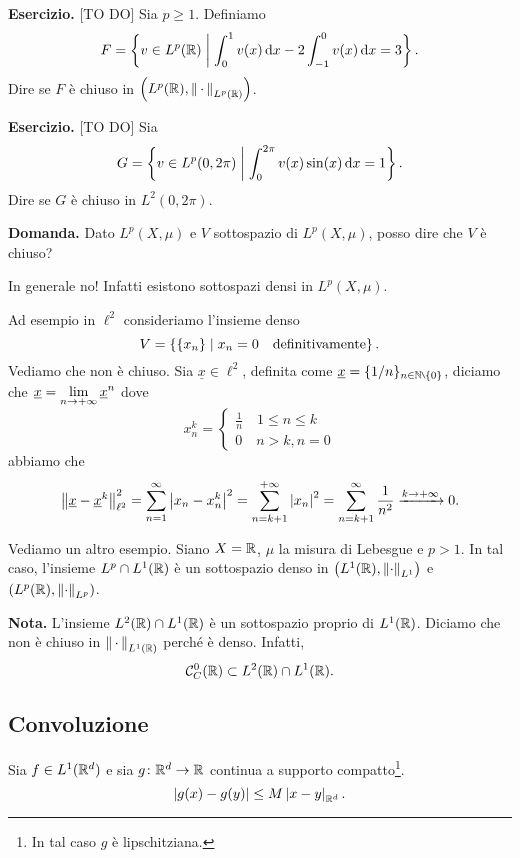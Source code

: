 \textbf{Esercizio.} [TO DO] Sia $p \geq 1$. Definiamo 
%
$$
F = \left\{ v \in L^p(\mathbb R) \;\middle|\; \int_{0}^{1} v(x) \,\mathrm{d} x - 2 \int_{-1}^{0} v(x) \,\mathrm{d} x = 3 \right\}.
$$
%
Dire se $F$ è chiuso in $\left( L^p(\mathbb R), \left\lVert \,\cdot\, \right\rVert_{L^p(\mathbb R)} \right)$.


\textbf{Esercizio.} [TO DO] Sia 
%
$$
G = \left\{ v \in L^p(0,2\pi) \;\middle|\; \int_{0}^{2\pi} v(x) \sin(x) \,\mathrm{d} x = 1  \right\}.
$$
%
Dire se $G$ è chiuso in $L^2(0,2\pi)$.

\textbf{Domanda.} Dato $L^p (X,\mu)$ e $V$ sottospazio di $L^p(X,\mu)$, posso dire che $V$ è chiuso?

In generale no! Infatti esistono sottospazi densi in $L^p(X,\mu)$.

Ad esempio in $\ell^2$ consideriamo l'insieme denso
%
$$
V = \left\{ \left\{ x_n \right\} \;\middle|\; x_n = 0 \quad \text{definitivamente}  \right\}.
$$
%
Vediamo che non è chiuso. Sia $\underline{x} \in \ell^2$, definita come $\underline{x} = \{ 1 / n \}_{n \in \N \setminus \{0 \}}$, diciamo che $\displaystyle \underline{x} = \lim_{n \to +\infty} \underline{x}^n$ dove
%
$$
x_n^k = 
\begin{cases}
\frac{1}{n} \quad 1 \leq n \leq k \\
0 \quad n > k, n = 0
\end{cases} 
$$
%
abbiamo che
%
$$
\left\lVert \underline{x} - \underline{x}^k \right\rVert_{\ell^2}^2 = \sum_{n=1}^{\infty} \left| x_n -x_n^k \right|^2 = \sum_{n = k+1}^{+\infty} \left| x_n \right|^2 = \sum_{n = k+1}^{\infty} \frac{1}{n^2} \xrightarrow{k \to +\infty} 0.   
$$
%

Vediamo un altro esempio. Siano $X = \mathbb R$, $\mu$ la misura di Lebesgue e $p > 1$.
In tal caso, l'insieme $L^p \cap L^1 (\mathbb R)$ è un sottospazio denso in $\left( L^1(\mathbb R), \left\lVert \cdot  \right\rVert_{L^1} \right)$ e $\left( L^p(\mathbb R), \left\lVert \cdot  \right\rVert_{L^p} \right)$.

\textbf{Nota.} L'insieme $L^2(\mathbb R) \cap L^1(\mathbb R)$ è un sottospazio proprio di $L^1(\mathbb R)$. Diciamo che non è chiuso in $\left\lVert \,\cdot\, \right\rVert_{L^1(\mathbb R)}$ perché è denso.
Infatti, 
%
$$
\mathcal{C}_C^0(\mathbb R) \subset L^2(\mathbb R) \cap L^1(\mathbb R).
$$
%

\subsection{Convoluzione}

Sia $f \in L^1(\mathbb R^d)$ e sia $g \colon \mathbb R^d \to \mathbb R$ continua a supporto compatto\footnote{In tal caso $g$ è lipschitziana.}.
%
$$
\left| g(x) - g(y) \right| \leq M \left| x - y \right|_{\mathbb R^d}.
$$
%

